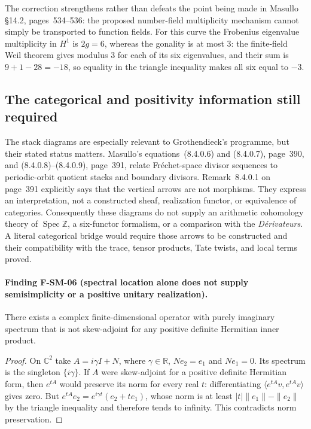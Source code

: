 The correction strengthens rather than defeats the point being made in
Masullo \S14.2, pages~534--536: the proposed number-field multiplicity
mechanism cannot simply be transported to function fields.  For this
curve the Frobenius eigenvalue multiplicity in $H^1$ is $2g=6$, whereas
the gonality is at most $3$: the finite-field Weil theorem gives modulus
$3$ for each of its six eigenvalues, and their sum is
$9+1-28=-18$, so equality in the triangle inequality makes all six
equal to $-3$.

\subsection{The categorical and positivity information still required}

The stack diagrams are especially relevant to Grothendieck's programme,
but their stated status matters.  Masullo's equations~(8.4.0.6) and
(8.4.0.7), page~390, and (8.4.0.8)--(8.4.0.9), page~391, relate
Fr\'echet-space divisor sequences to periodic-orbit quotient stacks and
boundary divisors.  Remark~8.4.0.1 on page~391 explicitly says that the
vertical arrows are not morphisms.  They express an interpretation, not
a constructed sheaf, realization functor, or equivalence of categories.
Consequently these diagrams do not supply an arithmetic cohomology theory
of $\operatorname{Spec}\mathbb Z$, a six-functor formalism, or a comparison
with the \emph{D\'erivateurs}.  A literal categorical bridge would require
those arrows to be constructed and their compatibility with the trace,
tensor products, Tate twists, and local terms proved.

\paragraph{Finding F-SM-06 (spectral location alone does not supply
semisimplicity or a positive unitary realization).}
There exists a complex finite-dimensional operator with purely imaginary
spectrum that is not skew-adjoint for any positive definite Hermitian
inner product.

\begin{proof}
On $\mathbb C^2$ take $A=i\gamma I+N$, where $\gamma\in\mathbb R$,
$Ne_2=e_1$ and $Ne_1=0$.  Its spectrum is the singleton $\{i\gamma\}$.
If $A$ were skew-adjoint for a positive definite Hermitian form, then
$e^{tA}$ would preserve its norm for every real $t$: differentiating
$\langle e^{tA}v,e^{tA}v\rangle$ gives zero.  But
$e^{tA}e_2=e^{i\gamma t}(e_2+te_1)$, whose norm is at least
$|t|\|e_1\|-\|e_2\|$ by the triangle inequality and therefore tends
to infinity.  This contradicts norm preservation.
\end{proof}

